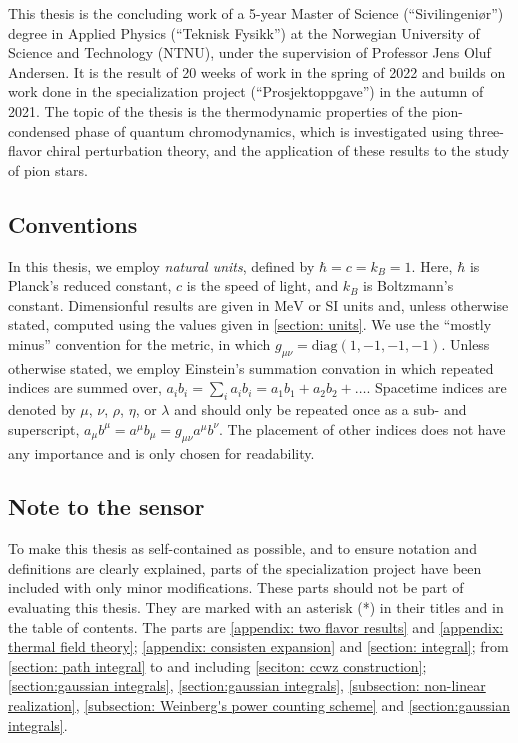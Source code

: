 This thesis is the concluding work of a 5-year Master of Science (``Sivilingeniør'') degree in Applied Physics (``Teknisk Fysikk'') at the Norwegian University of Science and Technology (NTNU), under the supervision of Professor Jens Oluf Andersen.
It is the result of 20 weeks of work in the spring of 2022 and builds on work done in the specialization project (``Prosjektoppgave'') in the autumn of 2021.
The topic of the thesis is the thermodynamic properties of the pion-condensed phase of quantum chromodynamics, which is investigated using three-flavor chiral perturbation theory, and the application of these results to the study of pion stars.

\subsection*{Conventions}

In this thesis, we employ \emph{natural units}, defined by $\hbar = c = k_B = 1$.
Here, $\hbar$ is Planck's reduced constant, $c$ is the speed of light, and $k_B$ is Boltzmann's constant.
Dimensionful results are given in $\text{MeV}$ or SI units and, unless otherwise stated, computed using the values given in \autoref{section: units}.
We use the ``mostly minus'' convention for the metric, in which $g_{\mu \nu} = \text{diag}(1, -1, -1, -1)$.
Unless otherwise stated, we employ Einstein's summation convation in which repeated indices are summed over, $a_i b_i = {\sum}_i a_i b_i = a_1 b_1 +  a_2 b_2 +\dots$.
Spacetime indices are denoted by $\mu$, $\nu$, $\rho$, $\eta$, or $\lambda$ and should only be repeated once as a sub- and superscript, $a_\mu b^\mu = a^\mu b_\mu = g_{\mu\nu}a^\mu b^\nu$.
The placement of other indices does not have any importance and is only chosen for readability.


\subsection*{Note to the sensor}

To make this thesis as self-contained as possible, and to ensure notation and definitions are clearly explained, parts of the specialization project have been included with only minor modifications.
These parts should not be part of evaluating this thesis.
They are marked with an asterisk (*) in their titles and in the table of contents.
The parts are \autoref{appendix: two flavor results} and \autoref{appendix: thermal field theory}; \autoref{appendix: consisten expansion} and \autoref{section: integral}; from \autoref{section: path integral} to and including \autoref{seciton: ccwz construction};  \autoref{section:gaussian integrals},  \autoref{section:gaussian integrals}, \autoref{subsection: non-linear realization}, \autoref{subsection: Weinberg's power counting scheme} and \autoref{section:gaussian integrals}.

